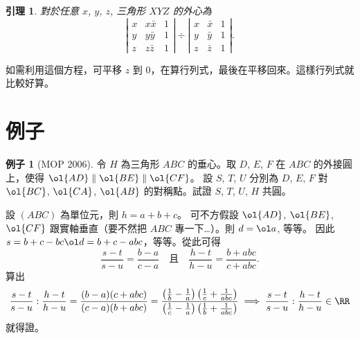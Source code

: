 \documentclass[11pt]{scrartcl}
\newtheorem{lemma}[theorem]{\color{blue!40!black}引理}
\theoremstyle{definition}
\newtheorem{example}[theorem]{\color{blue!40!black}例子}
\let\oldendproof\endproof
\renewenvironment{proof}[1][證]{%
  \oldproof[\bfseries 【#1】\nopunct]%
}{\oldendproof}
\begin{document}
\begin{lemma}
  對於任意 $x$, $y$, $z$, 三角形 $XYZ$ 的外心為
  \[ \left\lvert
    \begin{array}{ccc}
      x & x\bar x & 1 \\
      y & y\bar y & 1 \\
      z & z\bar z & 1
    \end{array}
  \right\rvert
  \div
  \left\lvert
    \begin{array}{ccc}
      x & \bar x & 1 \\
      y & \bar y & 1 \\
      z & \bar z & 1
    \end{array}
  \right\rvert. \]
\end{lemma}
如需利用這個方程，可平移 $z$ 到 $0$，在算行列式，最後在平移回來。這樣行列式就比較好算。

\section{例子}
\begin{example}
  [MOP 2006]
  令 $H$ 為三角形 $ABC$ 的垂心。取 $D$, $E$, $F$ 在 $ABC$ 的外接圓上，使得 $\ol{AD} \parallel \ol{BE} \parallel \ol{CF}$。
  設 $S$, $T$, $U$ 分別為 $D$, $E$, $F$ 對 $\ol{BC}$, $\ol{CA}$, $\ol{AB}$ 的對稱點。試證 $S$, $T$, $U$, $H$ 共圓。
\end{example}
\begin{proof}
  設 $(ABC)$ 為單位元，則 $h = a+b+c$。
  可不方假設 $\ol{AD}$, $\ol{BE}$,  $\ol{CF}$ 跟實軸垂直（要不然把 $ABC$ 專一下\dots）。則 $d = \ol a$, 等等。
  因此 $s = b+c - bc \ol d = b+c-abc$，等等。從此可得
  \[ \frac{s-t}{s-u}=\frac{b-a}{c-a}\quad\text{且}\quad\frac{h-t}{h-u}=\frac{b+abc}{c+abc}. \]
  算出 \[ \frac{s-t}{s-u} : \frac{h-t}{h-u} = \frac{(b-a)(c+abc)}{(c-a)(b+abc)}=\frac{\left(\frac{1}{b}-\frac{1}{a}\right)\left(\frac{1}{c}+\frac{1}{abc}\right)}{\left(\frac{1}{c}-\frac{1}{a}\right)\left(\frac{1}{b}+\frac{1}{abc}\right)} \implies \frac{s-t}{s-u}:\frac{h-t}{h-u} \in \RR \]
   就得證。
\end{proof}
\end{document}
